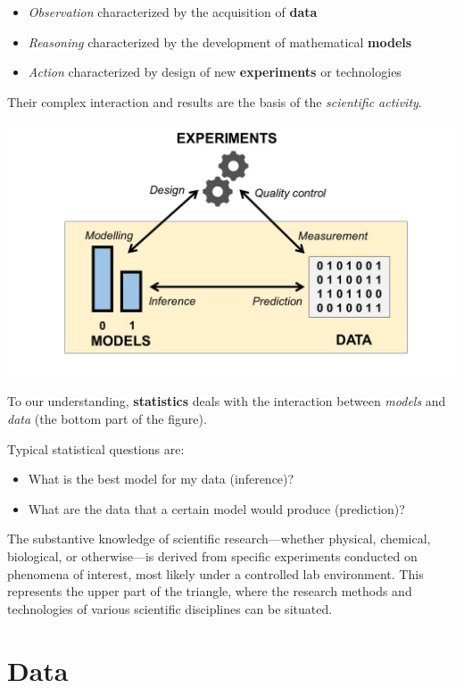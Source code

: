\documentclass[
]{book}
\providecommand{\tightlist}{%
  \setlength{\itemsep}{0pt}\setlength{\parskip}{0pt}}
\begin{document}
\begin{itemize}
\tightlist
\item
  \emph{Observation} characterized by the acquisition of \textbf{data}
\item
  \emph{Reasoning} characterized by the development of mathematical \textbf{models}
\item
  \emph{Action} characterized by design of new \textbf{experiments} or technologies
\end{itemize}

Their complex interaction and results are the basis of the \emph{scientific activity}.

\includegraphics{./figures/stats.JPG}

To our understanding, \textbf{statistics} deals with the interaction between \emph{models} and \emph{data} (the bottom part of the figure).

Typical statistical questions are:

\begin{itemize}
\tightlist
\item
  What is the best model for my data (inference)?
\item
  What are the data that a certain model would produce (prediction)?
\end{itemize}

The substantive knowledge of scientific research---whether physical, chemical, biological, or otherwise---is derived from specific experiments conducted on phenomena of interest, most likely under a controlled lab environment. This represents the upper part of the triangle, where the research methods and technologies of various scientific disciplines can be situated.

\hypertarget{data}{%
\section{Data}\label{data}}
\end{document}
